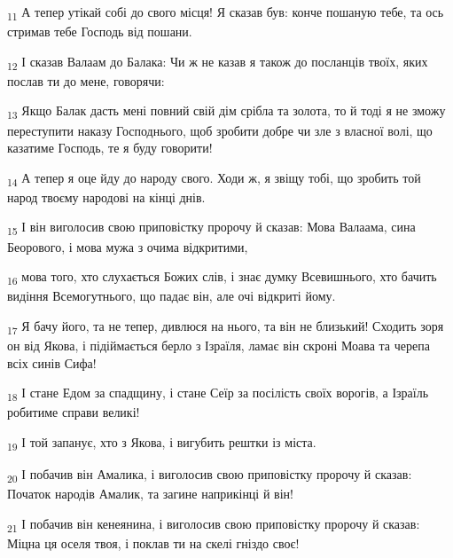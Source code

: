 \begin{tcolorbox}
\textsubscript{11} А тепер утікай собі до свого місця! Я сказав був: конче пошаную тебе, та ось стримав тебе Господь від пошани.
\end{tcolorbox}
\begin{tcolorbox}
\textsubscript{12} І сказав Валаам до Балака: Чи ж не казав я також до посланців твоїх, яких послав ти до мене, говорячи:
\end{tcolorbox}
\begin{tcolorbox}
\textsubscript{13} Якщо Балак дасть мені повний свій дім срібла та золота, то й тоді я не зможу переступити наказу Господнього, щоб зробити добре чи зле з власної волі, що казатиме Господь, те я буду говорити!
\end{tcolorbox}
\begin{tcolorbox}
\textsubscript{14} А тепер я оце йду до народу свого. Ходи ж, я звіщу тобі, що зробить той народ твоєму народові на кінці днів.
\end{tcolorbox}
\begin{tcolorbox}
\textsubscript{15} І він виголосив свою приповістку пророчу й сказав: Мова Валаама, сина Беорового, і мова мужа з очима відкритими,
\end{tcolorbox}
\begin{tcolorbox}
\textsubscript{16} мова того, хто слухається Божих слів, і знає думку Всевишнього, хто бачить видіння Всемогутнього, що падає він, але очі відкриті йому.
\end{tcolorbox}
\begin{tcolorbox}
\textsubscript{17} Я бачу його, та не тепер, дивлюся на нього, та він не близький! Сходить зоря он від Якова, і підіймається берло з Ізраїля, ламає він скроні Моава та черепа всіх синів Сифа!
\end{tcolorbox}
\begin{tcolorbox}
\textsubscript{18} І стане Едом за спадщину, і стане Сеїр за посілість своїх ворогів, а Ізраїль робитиме справи великі!
\end{tcolorbox}
\begin{tcolorbox}
\textsubscript{19} І той запанує, хто з Якова, і вигубить рештки із міста.
\end{tcolorbox}
\begin{tcolorbox}
\textsubscript{20} І побачив він Амалика, і виголосив свою приповістку пророчу й сказав: Початок народів Амалик, та загине наприкінці й він!
\end{tcolorbox}
\begin{tcolorbox}
\textsubscript{21} І побачив він кенеянина, і виголосив свою приповістку пророчу й сказав: Міцна ця оселя твоя, і поклав ти на скелі гніздо своє!
\end{tcolorbox}
